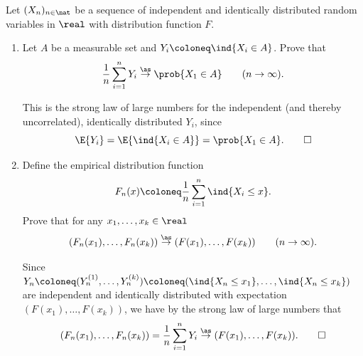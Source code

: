 \begin{exercise}
    \label{ex: mean of indicators}
    Let \((X_n)_{n\in \nat}\) be a sequence of independent and identically
    distributed random variables in \(\real\) with distribution function \(F\).
    \begin{enumerate}[label=(\alph*),noitemsep]
        \item Let \(A\) be a measurable set and \(Y_i \coloneq \ind{X_i \in A}\).
        Prove that
        \[
            \frac1n \sum_{i=1}^n Y_i \overset{\as}\to \prob{X_1 \in A}
            \qquad (n \to \infty).
        \]
        \begin{solution}
            This is the strong law of large numbers for the independent (and
            thereby uncorrelated), identically distributed \(Y_i\), since
            \[
                \E{Y_i} = \E{\ind{X_i \in A}} = \prob{X_1 \in A}.
                \qedhere
            \]
        \end{solution}

        \item Define the empirical distribution function
        \[
            F_n(x) \coloneq \frac1n \sum_{i=1}^n \ind{X_i \le x}.
        \]
        Prove that for any \(x_1, \dots, x_k \in \real\)
        \[
            (F_n(x_1), \dots, F_n(x_k)) \overset{\as}\to (F(x_1), \dots, F(x_k))
            \qquad (n \to \infty).
        \]
        \begin{solution}
            Since \(Y_n\coloneq (Y_n^{(1)}, \dots, Y_n^{(k)}) \coloneq (\ind{X_n
            \le x_1}, \dots, \ind{X_n \le x_k})\) are independent and
            identically distributed with expectation \((F(x_1), \dots,
            F(x_k))\), we have by the strong law of large numbers that
            \[
                (F_n(x_1), \dots, F_n(x_k)) = \frac1n \sum_{i=1}^n Y_i
                \overset{\as}\to (F(x_1), \dots, F(x_k)).
                \qedhere
            \]
        \end{solution}
    \end{enumerate}
\end{exercise}

